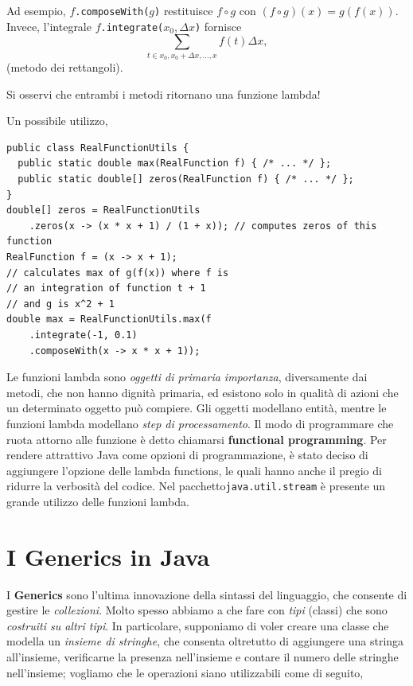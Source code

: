 \documentclass[\fontsizeclass,twocolumn]{\classname}
\theoremstyle{definition}
\theoremstyle{definition}
\begin{document}
Ad esempio, $f$\texttt{.composeWith(}$g$\texttt{)} restituisce $f \circ g$
con $(f \circ g)(x) = g(f(x))$. Invece, l'integrale
$f$\texttt{.integrate(}$x_0, \Delta x$\texttt{)} fornisce $$\sum_{t\in x_0,
x_0+\Delta x, \dots , x} f(t)\Delta x,$$ (metodo dei rettangoli).

Si osservi che entrambi i metodi ritornano una funzione lambda!

Un possibile utilizzo,

\begin{lstlisting}
public class RealFunctionUtils {  
  public static double max(RealFunction f) { /* ... */ };
  public static double[] zeros(RealFunction f) { /* ... */ };  
}
double[] zeros = RealFunctionUtils
    .zeros(x -> (x * x + 1) / (1 + x)); // computes zeros of this function
RealFunction f = (x -> x + 1);
// calculates max of g(f(x)) where f is
// an integration of function t + 1
// and g is x^2 + 1
double max = RealFunctionUtils.max(f
    .integrate(-1, 0.1)
    .composeWith(x -> x * x + 1));
\end{lstlisting}

Le funzioni lambda sono \emph{oggetti di primaria importanza}, diversamente dai
metodi, che non hanno dignità primaria, ed esistono solo in qualità di azioni
che un determinato oggetto può compiere. Gli oggetti modellano entità, mentre
le funzioni lambda modellano \emph{step di processamento}. Il modo di
programmare che ruota attorno alle funzione è detto chiamarsi
\textbf{functional programming}. Per rendere attrattivo Java come opzioni di
programmazione, è stato deciso di aggiungere l'opzione delle lambda functions,
le quali hanno anche il pregio di ridurre la verbosità del codice. Nel
pacchetto\texttt{java.util.stream} è presente un grande utilizzo delle funzioni
lambda.

\chapter{I Generics in Java}

I \textbf{Generics} sono l'ultima innovazione della sintassi del linguaggio,
che consente di gestire le \emph{collezioni}. Molto spesso abbiamo a che fare
con \emph{tipi} (classi) che sono \emph{costruiti su altri tipi}. In
particolare, supponiamo di voler creare una classe che modella un \emph{insieme
di stringhe}, che consenta oltretutto di aggiungere una stringa all'insieme,
verificarne la presenza nell'insieme e contare il numero delle stringhe
nell'insieme; vogliamo che le operazioni siano utilizzabili come di seguito,
\end{document}
